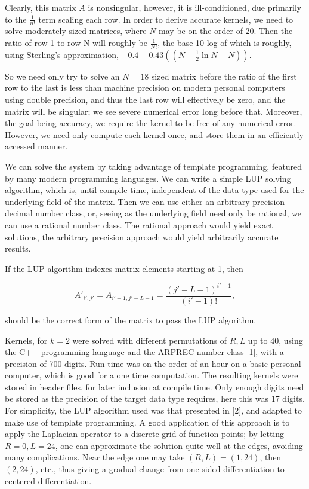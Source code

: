 \documentclass[amsmath,amssymb,floatfix]{revtex4}
\numberwithin{equation}{section}
\begin{document}
Clearly, this matrix $A$ is nonsingular, however, it is ill-conditioned, due primarily to the $\frac{1}{n!}$ term scaling each row. In order to derive accurate kernels, we need to solve moderately sized matrices, where $N$ may be on the order of 20. Then the ratio of row 1 to row N will roughly be $\frac{1}{N!}$, the base-10 log of which is roughly, using Sterling's approximation, $-0.4-0.43((N+\frac{1}{2} \ln{N} - N))$.

	So we need only try to solve an $N=18$ sized matrix before the ratio of the first row to the last is less than machine precision on modern personal computers using double precision, and thus the last row will effectively be zero, and the matrix will be singular; we see severe numerical error long before that. Moreover, the goal being accuracy, we require the kernel to be free of any numerical error. However, we need only compute each kernel once, and store them in an efficiently accessed manner.
	
	We can solve the system by taking advantage of template programming, featured by many modern programming languages. We can write a simple LUP solving algorithm, which is, until compile time, independent of the data type used for the underlying field of the matrix. Then we can use either an arbitrary precision decimal number class, or, seeing as the underlying field need only be rational, we can use a rational number class. The rational approach would yield exact solutions, the arbitrary precision approach would yield arbitrarily accurate results.
	
	If the LUP algorithm indexes matrix elements starting at 1, then
	
\begin{equation}
A'_{i',j'} = A_{i'-1,j'-L-1} = \frac{(j'-L-1)^{i'-1}}{(i'-1)!},
\end{equation}

\noindent
should be the correct form of the matrix to pass the LUP algorithm.


	
	Kernels, for $k=2$ were solved with different permutations of $R,L$ up to 40, using the C++ programming language and the  ARPREC number class [1], with a precision of 700 digits. Run time was on the order of an hour on a basic personal computer, which is good for a one time computation. The resulting kernels were stored in header files, for later inclusion at compile time. Only enough digits need be stored as the precision of the target data type requires, here this was 17 digits. For simplicity, the LUP algorithm used was that presented in [2], and adapted to make use of template programming. 
	A good application of this approach is to apply the Laplacian operator to a discrete grid of function points; by letting $R=0, L = 24$, one can approximate the solution quite well at the edges, avoiding many complications. Near the edge one may take $(R,L) = (1,24)$, then $(2,24)$, etc., thus giving a gradual change from one-sided differentiation to centered differentiation. 
\end{document}
